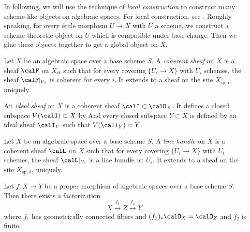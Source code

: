     In following, we will use the technique of \emph{local construction} to construct many scheme-like objects on algebraic spaces.
    For local construction, see \cite{Knu71}.
    Roughly speaking, for every \'etale morphism \(U \to X\) with \(U\) a scheme, we construct a scheme-theoretic object on \(U\) which is compatible under base change.
    Then we glue these objects together to get a global object on \(X\).

    \begin{definition}\label{def:coherent_sheaf_on_algebraic_space}
        Let \(X\) be an algebraic space over a base scheme \(S\).
        A \emph{coherent sheaf} on \(X\) is a sheaf \(\calF\) on \(X_{\text{\'et}}\) such that for every covering \(\{U_i \to X\}\) with \(U_i\) schemes, the sheaf \(\calF|_{U_i}\) is coherent for every \(i\).
        It extends to a sheaf on the site \(X_{\text{sp, \'et}}\) uniquely.

        An \emph{ideal sheaf} on \(X\) is a coherent sheaf \(\calI \subset \calO_X\).
        It defines a closed subspace \(V(\calI) \subset X\) by 
        And every closed subspace \(Y \subset X\) is defined by an ideal sheaf \(\calI_Y\) such that \(V(\calI_Y) = Y\).
    \end{definition}

    \begin{definition}\label{def:line_bundles_and_divisors_on_algebraic_space}
        Let \(X\) be an algebraic space over a base scheme \(S\).
        A \emph{line bundle} on \(X\) is a coherent sheaf \(\calL\) on \(X\) such that for every covering \(\{U_i \to X\}\) with \(U_i\) schemes, the sheaf \(\calL|_{U_i}\) is a line bundle on \(U_i\).
        It extends to a sheaf on the site \(X_{\text{sp, \'et}}\) uniquely.
    \end{definition}



    \begin{theorem}\label{thm:Stein_factorization_for_algebraic_space}
        Let \(f: X \to Y\) be a proper morphism of algebraic spaces over a base scheme \(S\).
        Then there exists a factorization 
        \[ X \xrightarrow{f_1} Z \xrightarrow{f_2} Y, \]
        where \(f_1\) has geometrically connected fibers and \((f_1)_*\calO_X = \calO_Z\) and \(f_2\) is finite.
    \end{theorem}

